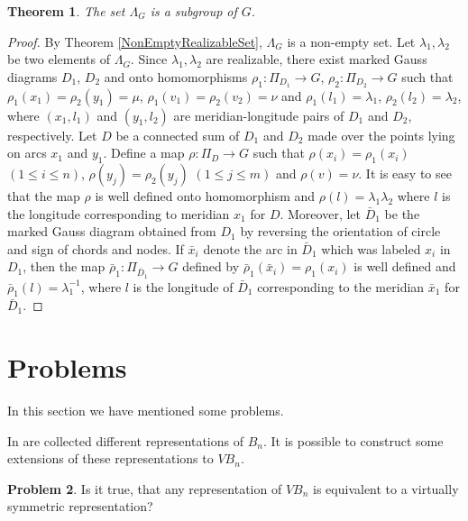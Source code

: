 \documentclass[11 pt, reqno]{amsart}
\newtheorem{theorem}{Theorem}[section]
\theoremstyle{definition}
\newtheorem{problem}[theorem]{Problem}
\numberwithin{equation}{subsection}
\begin{document}
\begin{theorem}\label{lambda-is-a-subgroup}
The set $\Lambda_G$ is a subgroup of $G$.
\end{theorem}
\begin{proof}
By Theorem \ref{NonEmptyRealizableSet}, $\Lambda_G$ is a non-empty set. Let $\lambda_1, \lambda_2$ be two elements of $\Lambda_G$. Since $\lambda_1, \lambda_2$ are realizable, there exist marked Gauss diagrams $D_1$, $D_2$ and onto homomorphisms $\rho_1: \Pi_{D_1} \to G$, $\rho_2: \Pi_{D_2} \to G$ such that $\rho_1(x_1)=\rho_2(y_1)=\mu$, $\rho_1(v_1)=\rho_2(v_2)=\nu$ and $\rho_1(l_1)=\lambda_1$, $\rho_2(l_2)=\lambda_2$, where $(x_1,l_1)$ and $(y_1,l_2)$ are meridian-longitude pairs of $D_1$ and $D_2$, respectively. Let $D$ be a connected sum of $D_1$ and $D_2$ made over the points lying on arcs $x_1$ and $y_1$. Define a map $\rho: \Pi_D \to G$ such that $\rho(x_i)=\rho_1(x_i)$ $(1 \leq i \leq n)$, $\rho(y_j)=\rho_2(y_j)$ $(1 \leq j \leq m)$ and $\rho(v)=\nu$. It is easy to see that the map $\rho$ is well defined onto homomorphism and $\rho(l)=\lambda_1 \lambda_2$ where $l$ is the longitude corresponding to meridian $x_1$ for $D$. Moreover, let $\bar{D}_1$ be the marked Gauss diagram obtained from $D_1$ by reversing the orientation of circle and sign of chords and nodes. If $\bar{x}_i$ denote the arc in $\bar{D}_1$ which was labeled $x_i$ in $D_1$, then the map $\bar{\rho}_1: \Pi_{\bar{D}_1} \to G$ defined by $\bar{\rho}_1(\bar{x}_i)=\rho_1(x_i)$ is well defined and $\bar{\rho}_1(l)=\lambda_1^{-1}$, where $l$ is the longitude of $\bar{D}_1$ corresponding to the meridian $\bar{x}_1$ for $\bar{D}_1$.
\end{proof}


\medskip

\section{Problems}\label{S: Problems}

In this section we have mentioned some problems.

In \cite{BB-2} are collected different representations of $B_n$. It is possible to construct some extensions of these representations to $VB_n$.

\begin{problem}
Is it true, that any representation of $VB_n$ is equivalent to a virtually symmetric representation?
\end{problem}
\end{document}
